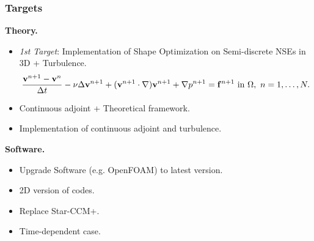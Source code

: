 \documentclass[t,xcolor=table,english]{beamer}   %
\begin{document}
\begin{frame}
	\frametitle{Targets}
	\textbf{Theory.}
	\begin{itemize}
		\item \textit{1st Target}: Implementation of Shape Optimization on Semi-discrete NSEs in 3D + Turbulence.
		\begin{align*}
		\frac{{\bf v}^{n+1} - {\bf v}^n}{\Delta t} - \nu\Delta{\bf v}^{n+1} + ({\bf v}^{n+1}\cdot\nabla){\bf v}^{n+1} + \nabla p^{n+1} = {\bf f}^{n+1} \mbox{ in } \Omega,\ n = 1,\ldots,N.
		\end{align*}
		\item Continuous adjoint + Theoretical framework.
		\item Implementation of continuous adjoint and turbulence.
	\end{itemize}
	\textbf{Software.}
	\begin{itemize}
		\item Upgrade Software (e.g. OpenFOAM) to latest version. 
		\item 2D version of codes.
		\item Replace Star-CCM+.
		\item Time-dependent case.
	\end{itemize}
\end{frame}
\end{document}
